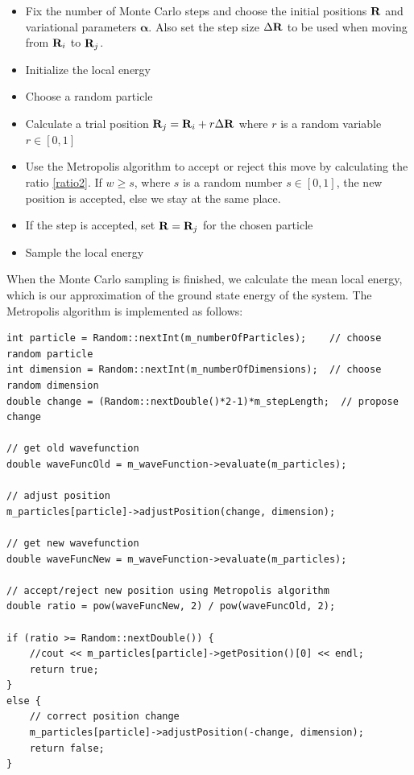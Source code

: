 \documentclass[english, a4paper]{article}
\begin{document}
\begin{itemize}
 \item Fix the number of Monte Carlo steps and choose the initial positions ${\bf R}$
       and variational parameters $\boldsymbol{\alpha}$.
       Also set the step size $\Delta {\bf R}$ to be used when moving from ${\bf R}_i$ to ${\bf R}_j$.
 \item Initialize the local energy
 \item Choose a random particle
 \item Calculate a trial position ${\bf R}_j = {\bf R}_i + r  \Delta {\bf R}$ where $r$ is a random variable
       $r \in [0,1]$
 \item Use the Metropolis algorithm to accept or reject this move by calculating the ratio \eqref{ratio2}. 
       If $w \geq s$, where $s$ is a random number $s \in [0,1]$, the new position is accepted, else we stay
       at the same place.
 \item If the step is accepted, set ${\bf R} = {\bf R}_j$ for the chosen particle
 \item Sample the local energy
\end{itemize}
When the Monte Carlo sampling is finished, we calculate the mean local energy, which is our approximation
of the ground state energy of the system.
The Metropolis algorithm is implemented as follows:
\belowcaptionskip=-10pt
\begin{lstlisting}[label=MetropolisBrute,caption=Brute Force Metropolis algorithm]
int particle = Random::nextInt(m_numberOfParticles);    // choose random particle
int dimension = Random::nextInt(m_numberOfDimensions);  // choose random dimension
double change = (Random::nextDouble()*2-1)*m_stepLength;  // propose change

// get old wavefunction
double waveFuncOld = m_waveFunction->evaluate(m_particles);

// adjust position
m_particles[particle]->adjustPosition(change, dimension);

// get new wavefunction
double waveFuncNew = m_waveFunction->evaluate(m_particles);

// accept/reject new position using Metropolis algorithm
double ratio = pow(waveFuncNew, 2) / pow(waveFuncOld, 2);

if (ratio >= Random::nextDouble()) {
    //cout << m_particles[particle]->getPosition()[0] << endl;
    return true;
}
else {
    // correct position change
    m_particles[particle]->adjustPosition(-change, dimension);
    return false;
}
\end{lstlisting}
\end{document}
